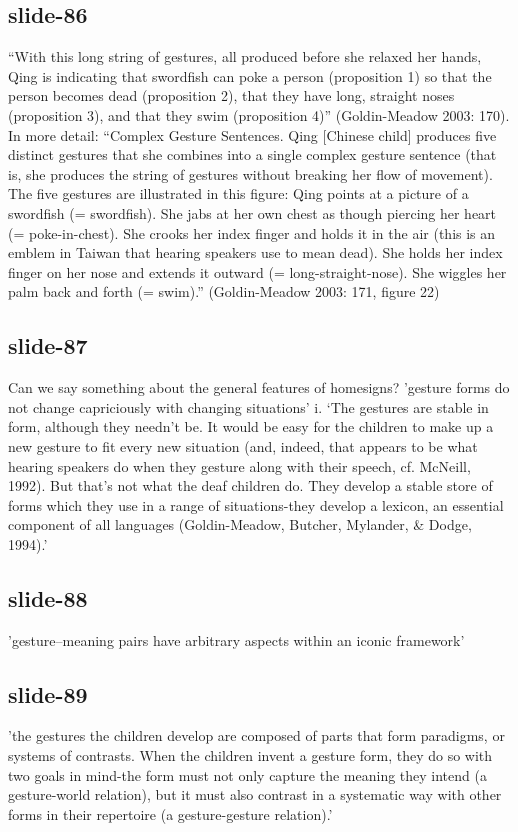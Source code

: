 \documentclass[12pt,\papersize]{extarticle}
\begin{document}
\subsection{slide-86}
“With this long string of gestures, all produced before she relaxed her hands, Qing is indicating that swordfish can poke a person (proposition 1) so that the person becomes dead (proposition 2), that they have long, straight noses (proposition 3), and that they swim (proposition 4)” (Goldin-Meadow 2003: 170).
In more detail: “Complex Gesture Sentences. Qing [Chinese child] produces five distinct gestures that she combines into a single complex gesture sentence (that is, she produces the string of gestures without breaking her flow of movement). The five gestures are illustrated in this figure: Qing points at a picture of a swordfish (= swordfish). She jabs at her own chest as though piercing her heart (= poke-in-chest). She crooks her index finger and holds it in the air (this is an emblem in Taiwan that hearing speakers use to mean dead). She holds her index finger on her nose and extends it outward (= long-straight-nose). She wiggles her palm back and forth (= swim).” (Goldin-Meadow 2003: 171, figure 22)
 
 
\subsection{slide-87}
Can we say something about the general features of homesigns?
'gesture forms do not change capriciously with changing situations'
i.	‘The gestures are stable in form, although they needn’t be. It would be easy for the children to make up a new gesture to fit every new situation (and, indeed, that appears to be what hearing speakers do when they gesture along with their speech, cf. McNeill, 1992). But that’s not what the deaf children do. They develop a stable store of forms which they use in a range of situations-they develop a lexicon, an essential component of all languages (Goldin-Meadow, Butcher, Mylander, \& Dodge, 1994).’ \citep[p.\ 1389]{Goldin-Meadow:2002dq}
 
 
\subsection{slide-88}
'gesture--meaning pairs have arbitrary aspects within an iconic framework'
 
 
\subsection{slide-89}
'the gestures the children develop are composed of parts that form paradigms, or systems of contrasts. When the children invent a gesture form, they do so with two goals in mind-the form must not only capture the meaning they intend (a gesture-world relation), but it must also contrast in a systematic way with other forms in their repertoire (a gesture-gesture relation).' \citep[p.\ 1389]{Goldin-Meadow:2002dq}
 
\end{document}
